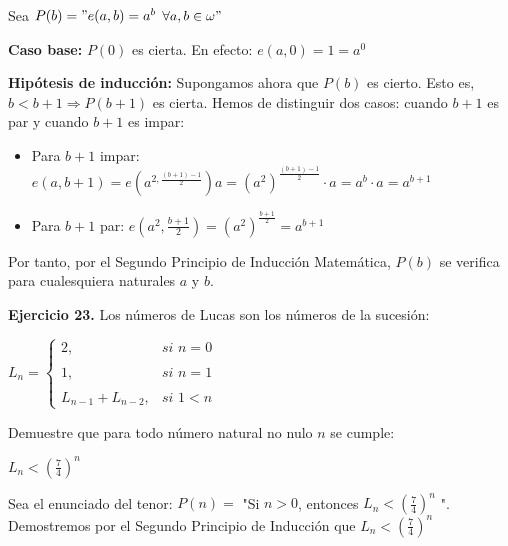 \documentclass[a4papper, 11pt]{article}
\begin{document}
\begin{flushleft}
    Sea $P(b) = "e(a,b) = a^{b}$ $ \forall a,b \in \omega"$ \newline
    
    \textbf{Caso base:} $P(0)$ es cierta. En efecto: \newline
    $e(a,0) = 1 = a^{0}$ \newline
    
    \textbf{Hipótesis de inducción:} Supongamos ahora que $P(b)$ es cierto. Esto es, $b < b+1 \Rightarrow P(b+1)$ es cierta. \newline
    Hemos de distinguir dos casos: cuando $b+1$ es par y cuando $b+1$ es impar:
    
    \begin{itemize}
    	\item Para $b+1$ impar: \newline
    	$e(a,b+1) = e(a^{2, \frac{(b+1)-1}{2}})a = (a^{2})^{\frac{(b+1)-1}{2}} \cdot a = a^{b} \cdot a = a^{b+1}$
    	\item Para $b+1$ par: \newline
    	$e(a^{2}, \frac{b+1}{2}) = (a^{2})^{\frac{b+1}{2}} = a^{b+1}$
    \end{itemize}

Por tanto, por el Segundo Principio de Inducción Matemática, $P(b)$ se verifica para cualesquiera naturales $a$ y $b$.\newline



\textbf{Ejercicio 23.} Los números de Lucas son los números de la sucesión: \newline

\hfil     $L_{n}=  \left\{ \begin{array}{lcc}
2, & \textit{si } n = 0 \\
\\  1, & \textit{si }  n = 1 \\
\\ L_{n-1} + L_{n-2}, & \textit{si } 1 < n
\end{array}
\right. $ \newline

Demuestre que para todo número natural no nulo $n$ se cumple: \newline

\hfil $L_{n} < (\frac{7}{4})^{n}$ \newline

Sea el enunciado del tenor: $P(n) = $ "Si $n > 0$, entonces $L_{n} < (\frac{7}{4})^{n}$ ". 
Demostremos por el Segundo Principio de Inducción que $L_{n} < (\frac{7}{4})^{n}$ \newline


\end{flushleft}
\end{document}
